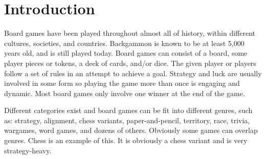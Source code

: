 \chapter{Introduction}
\label{chap:introduction}

Board games have been played throughout almost all of history, within different cultures, societies, and countries. Backgammon is known to be at least 5,000 years old, and is still played today. Board games can consist of a board, some player pieces or tokens, a  deck of cards, and/or dice. The given player or players follow a set of rules in an attempt to achieve a goal. Strategy and luck are usually involved in some form so playing the game more than once is engaging and dynamic. Most board games only involve one winner at the end of the game.

Different categories exist and board games can be fit into different genres, such as: strategy, alignment, chess variants, paper-and-pencil, territory, race, trivia, wargames, word games, and dozens of others. Obviously some games can overlap genres. Chess is an example of this. It is obviously a chess variant and is very strategy-heavy.

